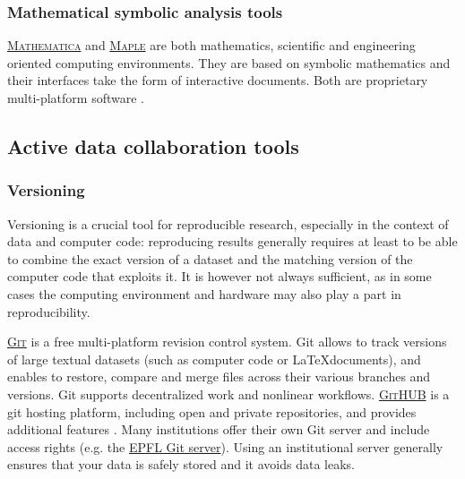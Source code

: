 \subsubsection{Mathematical symbolic analysis tools}

\noindent {}  \textsc{\href{http://www.wolfram.com/mathematica/}{Mathematica}} and  \textsc{\href{http://www.maplesoft.com/products/maple/}{Maple}} are both mathematics, scientific and engineering oriented computing environments. They are based on symbolic mathematics and their interfaces take the form of interactive documents. Both are proprietary multi-platform software \cite{maplesoft_maple_2015,wolfram_wolfram_2015}.


\subsection{Active data collaboration tools}

\subsubsection{Versioning}

\noindent Versioning is a crucial tool for reproducible research, especially in the context of data and computer code: reproducing results generally requires at least to be able to combine the exact version of a dataset and the matching version of the computer code that exploits it. It is however not always sufficient, as in some cases the computing environment and hardware may also play a part in reproducibility.

\vspace{0.4cm}

\noindent {} \textsc{\href{https://git-scm.com/}{Git}} is a free multi-platform revision control system. Git allows to track versions of large textual datasets (such as computer code or \LaTeX documents), and enables to restore, compare and merge files across their various branches and versions. Git supports decentralized work and nonlinear workflows.  \textsc{\href{https://github.com/}{GitHUB}} is a git hosting platform, including open and private repositories, and provides additional features \cite{_git_2015,github_github_2015}. Many institutions offer their own Git server and include access rights (e.g. the \href{http://git.epfl.ch}{EPFL Git server}). Using an institutional server generally ensures that your data is safely stored and it avoids data leaks. 


